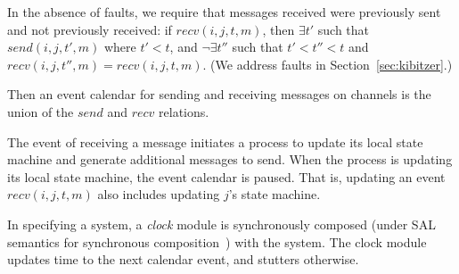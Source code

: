 \documentclass{llncs/llncs}
\newcommand{\lee}[1]{ } %
\newcommand{\lee}[1]{ {\color{blue}$<$lee: #1$>$} } %
\begin{document}
In the absence of faults, we require that messages received were previously sent and not previously received: if $recv(i, j, t, m)$, then $\exists t'$ such that $send(i, j, t', m)$ where $t' < t$, and $\neg\exists t''$ such that $t' < t'' < t$ and $recv(i, j, t'', m) = recv(i, j, t, m)$. (We address faults in Section~\ref{sec:kibitzer}.)

Then an event calendar for sending and receiving messages on channels is the union of the $send$ and $recv$ relations.

The event of receiving a message initiates a process to update its local state machine and generate additional messages to send. When the process is updating its local state machine, the event calendar is paused. That is, updating an event $recv(i, j, t, m)$ also includes updating $j$'s state machine.

In specifying a system, a \emph{clock} module is synchronously composed (under SAL semantics for synchronous composition~\cite{SAL}) with the system. The clock module updates time to the next calendar event, and stutters otherwise.


\lee{Cutting synchronous observer section; need to talk about use for lemmas elsewhere.}



\end{document}

